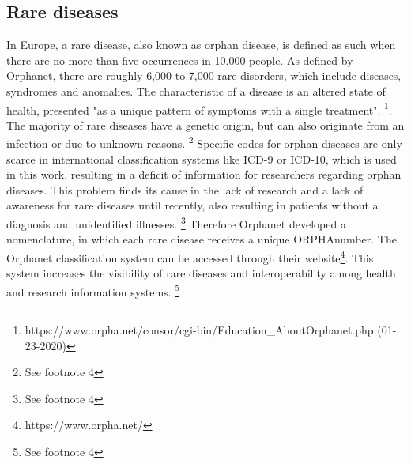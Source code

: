 \documentclass[11pt, a4paper, oneside]{book}
\begin{document}
\subsection{Rare diseases}
In Europe, a rare disease, also known as orphan disease, is defined as such when there are no more than five occurrences in 10.000 people. As defined by Orphanet, there are roughly 6,000 to 7,000 rare disorders, which include diseases, syndromes and anomalies. The characteristic of a disease is an altered state of health, presented "as a unique pattern of symptoms with a single treatment". \footnote{\label{Orphanet}https://www.orpha.net/consor/cgi-bin/Education\_AboutOrphanet.php (01-23-2020)}. The majority of rare diseases have a genetic origin, but can also originate from an infection or due to unknown reasons. \footnote{See footnote 4} Specific codes for orphan diseases are only scarce in international classification systems like ICD-9 or ICD-10, which is used in this work, resulting in a deficit of information for researchers regarding orphan diseases. This problem finds its cause in the lack of research and a lack of awareness for rare diseases until recently, also resulting in patients without a diagnosis and unidentified illnesses. \footnote{See footnote 4}
Therefore Orphanet developed a nomenclature, in which each rare disease receives a unique ORPHAnumber. The Orphanet classification system can be accessed through their website\footnote{https://www.orpha.net/}. This system increases the visibility of rare diseases and interoperability among health and research information systems. \footnote{See footnote 4}
\end{document}
